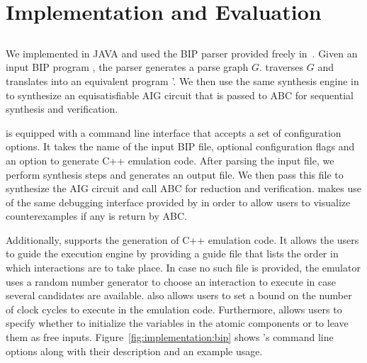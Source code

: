 \section{Implementation and Evaluation}
\label{sect-implem}



\subsection{\biptool{}} \label{chap:implementation:bip}
We implemented \biptool{} in JAVA and used the BIP parser provided 
freely in~\cite{verimagbiponline}. Given an input BIP program \Pm, 
the parser generates a parse graph $G$. \biptool{} traverses $G$ 
and translates \Pm into an equivalent \thislanguage{} program 
\Pm'. We then use the same synthesis engine in \mytool{} to synthesize
an equisatisfiable AIG circuit \aigcircuit{} that is passed to ABC 
for sequential synthesis and verification.

\biptool{} is equipped with a command line interface that accepts a set
of configuration options. It takes the name of the input BIP file, optional 
configuration flags and an option to generate C++ emulation code. After 
parsing the input file, we perform synthesis steps and generates 
an output \thislanguage{} file. 
We then pass this file to synthesize the AIG circuit \aigcircuit{}
and call ABC for reduction and verification. \biptool{} makes use of the same debugging
interface provided by \mytool{} in order to allow users to visualize counterexamples
if any is return by ABC. 

Additionally, \biptool{} supports the generation of C++ emulation code. It allows
the users to guide the execution engine by providing a guide file
that lists the order in which interactions are to take place. In case no such file 
is provided, the emulator uses a random number generator to choose an interaction to execute
in case several candidates  are available. \biptool{} also allows
users to set a bound on the number of clock cycles to execute in the emulation code. 
Furthermore, \biptool{} allows users to specify whether to initialize the variables 
in the atomic components or to leave them as free inputs. Figure~\ref{fig:implementation:bip}
shows \biptool's command line options along with their description and an example usage. 


